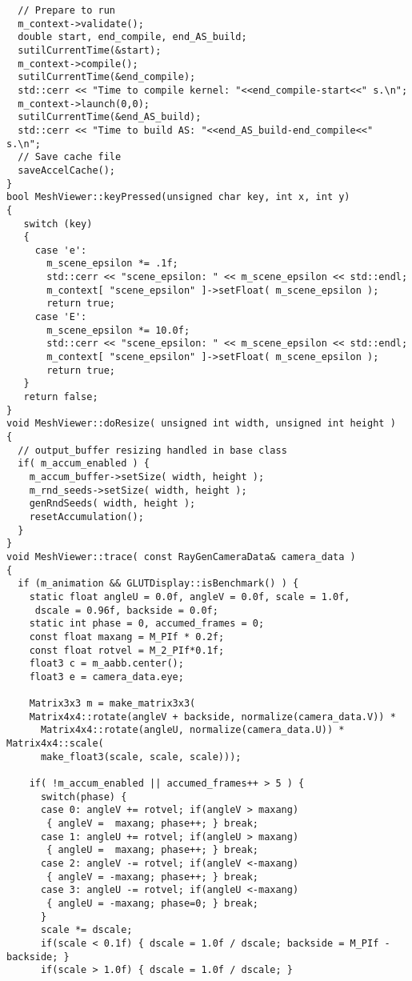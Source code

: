 \begin{verbatim}
  // Prepare to run 
  m_context->validate();
  double start, end_compile, end_AS_build;
  sutilCurrentTime(&start);
  m_context->compile();
  sutilCurrentTime(&end_compile);
  std::cerr << "Time to compile kernel: "<<end_compile-start<<" s.\n";
  m_context->launch(0,0);
  sutilCurrentTime(&end_AS_build);
  std::cerr << "Time to build AS: "<<end_AS_build-end_compile<<" s.\n";
  // Save cache file
  saveAccelCache();
}
bool MeshViewer::keyPressed(unsigned char key, int x, int y)
{
   switch (key)
   {
     case 'e':
       m_scene_epsilon *= .1f;
       std::cerr << "scene_epsilon: " << m_scene_epsilon << std::endl;
       m_context[ "scene_epsilon" ]->setFloat( m_scene_epsilon );
       return true;
     case 'E':
       m_scene_epsilon *= 10.0f;
       std::cerr << "scene_epsilon: " << m_scene_epsilon << std::endl;
       m_context[ "scene_epsilon" ]->setFloat( m_scene_epsilon );
       return true;
   }
   return false;
}
void MeshViewer::doResize( unsigned int width, unsigned int height )
{
  // output_buffer resizing handled in base class
  if( m_accum_enabled ) {
    m_accum_buffer->setSize( width, height );
    m_rnd_seeds->setSize( width, height );
    genRndSeeds( width, height );
    resetAccumulation();
  }
}
void MeshViewer::trace( const RayGenCameraData& camera_data )
{
  if (m_animation && GLUTDisplay::isBenchmark() ) {
    static float angleU = 0.0f, angleV = 0.0f, scale = 1.0f,
     dscale = 0.96f, backside = 0.0f;
    static int phase = 0, accumed_frames = 0;
    const float maxang = M_PIf * 0.2f;
    const float rotvel = M_2_PIf*0.1f;
    float3 c = m_aabb.center();
    float3 e = camera_data.eye;

    Matrix3x3 m = make_matrix3x3(
    Matrix4x4::rotate(angleV + backside, normalize(camera_data.V)) * 
      Matrix4x4::rotate(angleU, normalize(camera_data.U)) * Matrix4x4::scale(
      make_float3(scale, scale, scale)));

    if( !m_accum_enabled || accumed_frames++ > 5 ) {
      switch(phase) {
      case 0: angleV += rotvel; if(angleV > maxang)
       { angleV =  maxang; phase++; } break;
      case 1: angleU += rotvel; if(angleU > maxang)
       { angleU =  maxang; phase++; } break;
      case 2: angleV -= rotvel; if(angleV <-maxang)
       { angleV = -maxang; phase++; } break;
      case 3: angleU -= rotvel; if(angleU <-maxang)
       { angleU = -maxang; phase=0; } break;
      }
      scale *= dscale;
      if(scale < 0.1f) { dscale = 1.0f / dscale; backside = M_PIf - backside; }
      if(scale > 1.0f) { dscale = 1.0f / dscale; }


\end{verbatim}
